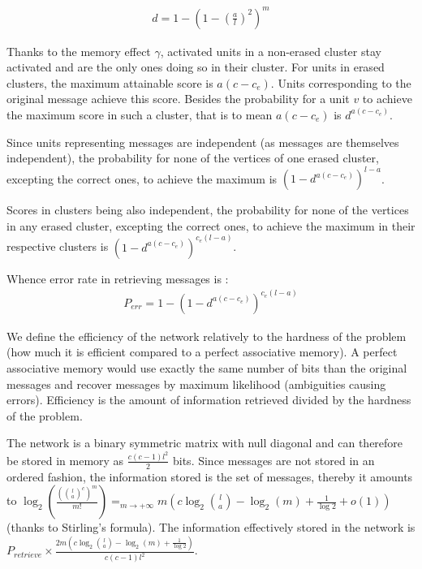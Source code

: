 \documentclass[english,11pt,twocolumn]{article}
\theoremstyle{definition}
\begin{document}
	\begin{align}
		\label{formula_density}
		d = 1 - \left( 1 - \left(\frac{a}{l}\right)^2 \right)^m 
	\end{align}		
	
	Thanks to the memory effect $\gamma$, activated units in a non-erased cluster stay activated and are the only ones doing so in their cluster. For units in erased clusters, the maximum attainable score is $a(c - c_e)$. Units corresponding to the original message achieve this score. Besides the probability for a unit $v$ to achieve the maximum score in such a cluster, that is to mean $a(c-c_e)$ is $d^{a(c-c_e)}$.
	
	
	Since units representing messages are independent (as messages are themselves independent), the probability for none of the vertices of one erased cluster, excepting the correct ones, to achieve the maximum is $\left(1 - d^	{a(c-c_e)}\right)^{l-a}$.
	
	Scores in clusters being also independent, the probability for none of the vertices in any erased cluster, excepting the correct ones, to achieve the maximum in their respective clusters is $\left(1 - d^	{a(c-c_e)}\right)^{c_e(l-a)}$.
	
	Whence error rate in retrieving messages is : 
	\begin{align}	
	P_{err} = 1 -	\left(1 - d^	{a(c-c_e)}\right)^{c_e(l-a)} 
	\end{align}	 
	
	We define the efficiency of the network relatively to the hardness of the problem (how much it is efficient compared to a perfect associative memory). A perfect associative memory would use exactly the same number of bits than the original messages and recover messages by maximum likelihood (ambiguities causing errors). Efficiency is the amount of information retrieved divided by the hardness of the problem.
	
	The network is a binary symmetric matrix with null diagonal and can therefore be stored in memory as $\frac{c(c-1) l^2}{2}$ bits. Since messages are not stored in an ordered fashion, the information stored is the set of messages, thereby it amounts to $\log_2(\frac{({l \choose a}^c)^m}{m!}) \mathop{=}_{m \rightarrow +\infty} m(c \log_2{l \choose a } - \log_2(m) + \frac{1}{\log 2} + o(1)) $ (thanks to  Stirling's formula). The information effectively stored in the network is $P_{retrieve} \times  \frac{2m \left(c \log_2{l \choose a } - \log_2(m) + \frac{1}{\log 2} \right)}{c(c-1)l^2}$.
	
\end{document}
